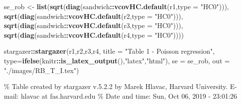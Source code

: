 \documentclass[]{book}
\newenvironment{Shaded}{\begin{snugshade}}{\end{snugshade}}
\newcommand{\KeywordTok}[1]{\textcolor[rgb]{0.13,0.29,0.53}{\textbf{#1}}}
\newcommand{\DataTypeTok}[1]{\textcolor[rgb]{0.13,0.29,0.53}{#1}}
\newcommand{\StringTok}[1]{\textcolor[rgb]{0.31,0.60,0.02}{#1}}
\newcommand{\OperatorTok}[1]{\textcolor[rgb]{0.81,0.36,0.00}{\textbf{#1}}}
\newcommand{\NormalTok}[1]{#1}
\begin{document}
\begin{Shaded}
\begin{Highlighting}[]
\NormalTok{se_rob <-}\StringTok{ }\KeywordTok{list}\NormalTok{(}\KeywordTok{sqrt}\NormalTok{(}\KeywordTok{diag}\NormalTok{(sandwich}\OperatorTok{::}\KeywordTok{vcovHC.default}\NormalTok{(r1,}\DataTypeTok{type =} \StringTok{"HC0"}\NormalTok{))),}
               \KeywordTok{sqrt}\NormalTok{(}\KeywordTok{diag}\NormalTok{(sandwich}\OperatorTok{::}\KeywordTok{vcovHC.default}\NormalTok{(r2,}\DataTypeTok{type =} \StringTok{"HC0"}\NormalTok{))),}
               \KeywordTok{sqrt}\NormalTok{(}\KeywordTok{diag}\NormalTok{(sandwich}\OperatorTok{::}\KeywordTok{vcovHC.default}\NormalTok{(r3,}\DataTypeTok{type =} \StringTok{"HC0"}\NormalTok{))),}
               \KeywordTok{sqrt}\NormalTok{(}\KeywordTok{diag}\NormalTok{(sandwich}\OperatorTok{::}\KeywordTok{vcovHC.default}\NormalTok{(r4,}\DataTypeTok{type =} \StringTok{"HC0"}\NormalTok{))))}
\end{Highlighting}
\end{Shaded}

\begin{Shaded}
\begin{Highlighting}[]
\NormalTok{stargazer}\OperatorTok{::}\KeywordTok{stargazer}\NormalTok{(r1,r2,r3,r4, }\DataTypeTok{title =} \StringTok{"Table 1 - Poisson regression"}\NormalTok{, }
          \DataTypeTok{type=}\KeywordTok{ifelse}\NormalTok{(knitr}\OperatorTok{::}\KeywordTok{is_latex_output}\NormalTok{(),}\StringTok{"latex"}\NormalTok{,}\StringTok{"html"}\NormalTok{), }\DataTypeTok{se =}\NormalTok{ se_rob, }\DataTypeTok{out =} \StringTok{"./images/RB_T_I.tex"}\NormalTok{)}
\end{Highlighting}
\end{Shaded}

\% Table created by stargazer v.5.2.2 by Marek Hlavac, Harvard
University. E-mail: hlavac at fas.harvard.edu \% Date and time: Sun, Oct
06, 2019 - 23:01:26
\end{document}
